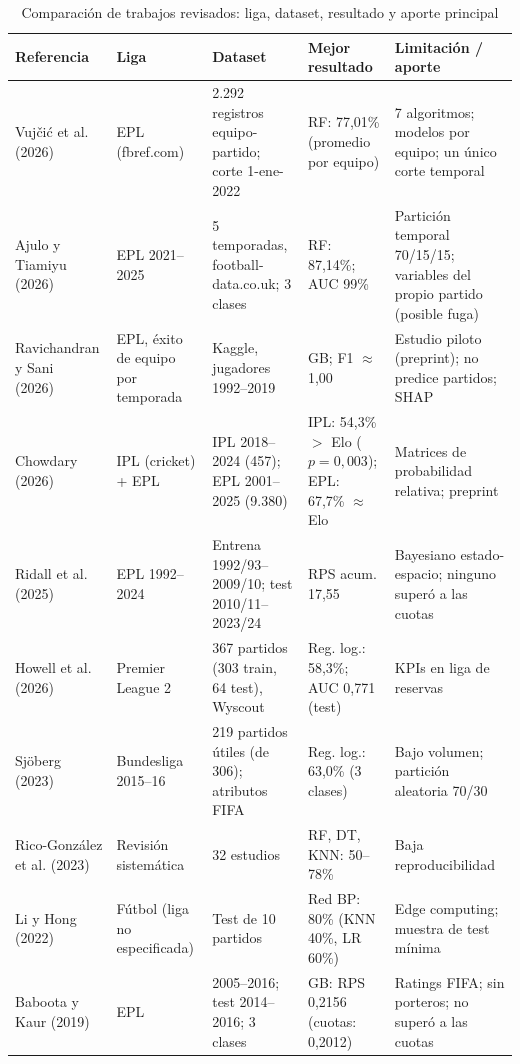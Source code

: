 \documentclass{ieeeaccess}
\begin{document}
\begin{table}[!t]
\caption{Comparación de trabajos revisados: liga, dataset, resultado y aporte principal}
\label{tab:literatura}
\setlength{\tabcolsep}{2pt}
\footnotesize
\begin{tabular}{@{}p{3.2cm}p{2.2cm}p{3.4cm}p{2.6cm}p{4.6cm}@{}}
\toprule
\textbf{Referencia} & \textbf{Liga} & \textbf{Dataset} & \textbf{Mejor resultado} & \textbf{Limitación / aporte} \\
\midrule
Vujčić et al. (2026)~\cite{vujcic2026supervised} & EPL (fbref.com) & 2.292 registros equipo-partido; corte 1-ene-2022 & RF: 77,01\% (promedio por equipo) & 7 algoritmos; modelos por equipo; un único corte temporal \\
Ajulo y Tiamiyu (2026)~\cite{ajulo2026ml} & EPL 2021--2025 & 5 temporadas, football-data.co.uk; 3 clases & RF: 87,14\%; AUC 99\% & Partición temporal 70/15/15; variables del propio partido (posible fuga) \\
Ravichandran y Sani (2026)~\cite{ravichandran2026framework} & EPL, éxito de equipo por temporada & Kaggle, jugadores 1992--2019 & GB; F1 $\approx$ 1,00 & Estudio piloto (preprint); no predice partidos; SHAP \\
Chowdary (2026)~\cite{chowdary2026dynamic} & IPL (cricket) + EPL & IPL 2018--2024 (457); EPL 2001--2025 (9.380) & IPL: 54,3\% $>$ Elo ($p=0{,}003$); EPL: 67,7\% $\approx$ Elo & Matrices de probabilidad relativa; preprint \\
Ridall et al. (2025)~\cite{ridall2025bayesian} & EPL 1992--2024 & Entrena 1992/93--2009/10; test 2010/11--2023/24 & RPS acum. 17,55 & Bayesiano estado-espacio; ninguno superó a las cuotas \\
Howell et al. (2026)~\cite{howell2026winning} & Premier League 2 & 367 partidos (303 train, 64 test), Wyscout & Reg. log.: 58,3\%; AUC 0,771 (test) & KPIs en liga de reservas \\
Sjöberg (2023)~\cite{sjoborg2023football} & Bundesliga 2015--16 & 219 partidos útiles (de 306); atributos FIFA & Reg. log.: 63,0\% (3 clases) & Bajo volumen; partición aleatoria 70/30 \\
Rico-González et al. (2023)~\cite{ricogonzalez2023ml} & Revisión sistemática & 32 estudios & RF, DT, KNN: 50--78\% & Baja reproducibilidad \\
Li y Hong (2022)~\cite{li2022football} & Fútbol (liga no especificada) & Test de 10 partidos & Red BP: 80\% (KNN 40\%, LR 60\%) & Edge computing; muestra de test mínima \\
Baboota y Kaur (2019)~\cite{baboota2019predictive} & EPL & 2005--2016; test 2014--2016; 3 clases & GB: RPS 0,2156 (cuotas: 0,2012) & Ratings FIFA; sin porteros; no superó a las cuotas \\
\bottomrule
\end{tabular}
\end{table}
\end{document}
